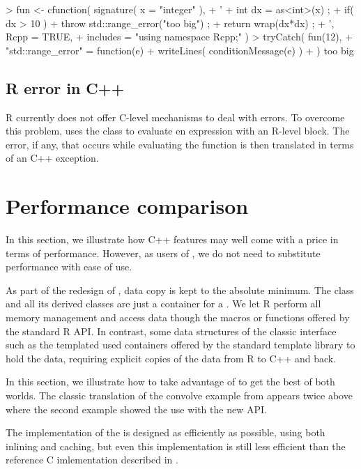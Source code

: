 \begin{example}
> fun <- cfunction( signature( x = "integer" ), 
+ ' 
+   int dx = as<int>(x) ;
+   if( dx > 10 ) 
+      throw std::range_error("too big") ;
+   return wrap(dx*dx) ;
+ ', Rcpp = TRUE, 
+  includes = "using namespace Rcpp;" )
> tryCatch( fun(12), 
+ "std::range_error" = function(e){
+    writeLines( conditionMessage(e) )
+ } )
too big
\end{example}

\subsection{R error in C++}

R currently does not offer C-level mechanisms to deal with errors. To 
overcome this problem,  uses the 
class to evaluate en expression with an R-level 
block. The error, if any, that occurs while evaluating the 
function is then translated in terms of an C++ exception. 


\section{Performance comparison}

In this section, we illustrate how C++ features may well come with a price
in terms of performance. However, as users of , we do not need to
substitute performance with ease of use.

As part of the redesign of , data copy is kept to the
absolute minimum. The  class and all its derived
classes are just a container for a . We let R perform
all memory management and access data though the macros or functions
offered by the standard R API. In contrast, some data structures
of the classic  interface such as the templated 
 used containers offered by the standard template
library to hold the data, requiring explicit copies of the data 
from R to C++ and back.

In this section, we illustrate how to take advantage of  to get
the best of both worlds. The classic  translation of the convolve example from
\cite{R:exts} appears twice above where the second example showed the use
with the new API.

The implementation of the  is designed as 
efficiently as possible, using both inlining and caching, 
but even this implementation is still less efficient than the 
reference C imlementation described in \cite{R:exts}.


